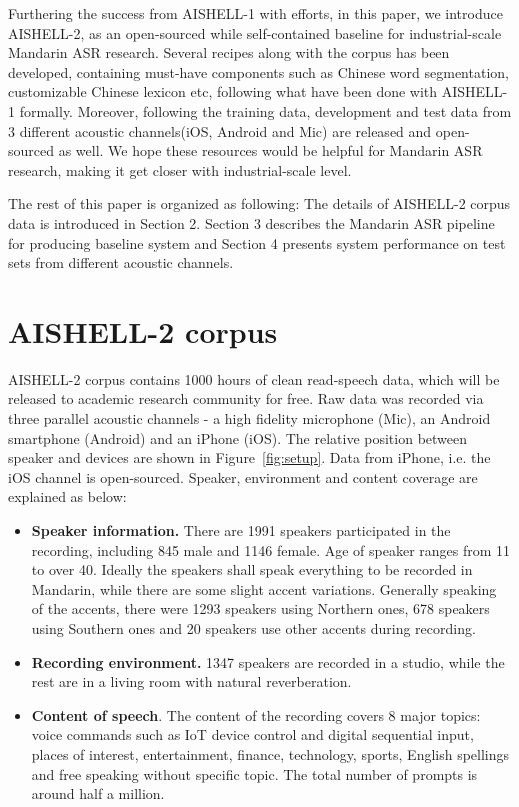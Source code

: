 \documentclass[a4paper]{article}
\begin{document}
Furthering the success from AISHELL-1 with efforts, in this paper, we introduce AISHELL-2, as an open-sourced while self-contained baseline for industrial-scale Mandarin ASR research. 
Several recipes along with the corpus has been developed, containing must-have components such as Chinese word segmentation, 
customizable Chinese lexicon etc, following what have been done with AISHELL-1 formally.
Moreover, following the training data, development and test data from 3 different acoustic channels(iOS, Android and Mic) are released and open-sourced as well.
We hope these resources would be helpful for Mandarin ASR research, making it get closer with industrial-scale level.

The rest of this paper is organized as following: The details of AISHELL-2 corpus data is introduced in Section 2. Section 3 describes the Mandarin ASR pipeline for producing baseline system and Section 4 presents system performance on test sets from different acoustic channels.

\section{AISHELL-2 corpus}

AISHELL-2 corpus contains 1000 hours of clean read-speech data, which will be released to academic research community for free. Raw data was recorded via three parallel acoustic channels - a high fidelity microphone (Mic), an Android smartphone (Android) and an iPhone (iOS). The relative position between speaker and devices are shown in Figure~\ref{fig:setup}. Data from iPhone, i.e. the iOS channel is open-sourced. Speaker, environment and content coverage are explained as below:
\begin{itemize}
\item \textbf{Speaker information.} There are 1991 speakers participated in the recording, including 845 male and 1146 female. Age of speaker ranges from 11 to over 40. Ideally the speakers shall speak everything to be recorded in Mandarin, while there are some slight accent variations. Generally speaking of the accents, there were 1293 speakers using Northern ones, 678 speakers using Southern ones and 20 speakers use other accents during recording. 
\item \textbf{Recording environment.} 1347 speakers are recorded in a studio, while the rest are in a living room with natural reverberation.
\item \textbf{Content of speech}. The content of the recording covers 8 major topics: voice commands such as IoT device control and digital sequential input, places of interest, entertainment, finance, technology, sports, English spellings and free speaking without specific topic. The total number of prompts is around half a million.
\end{itemize}
\end{document}
